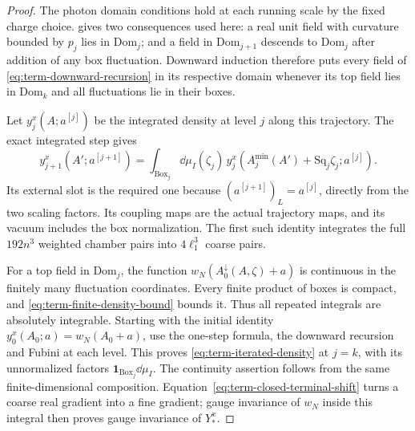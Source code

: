 \begin{proof}
The photon domain conditions
\cite[(43)]{MaxwellBlock} hold at each
running scale by the fixed charge choice.
\cite[Theorem~B]{MaxwellBlock} gives
two consequences used here: a real unit field with
curvature bounded by $p_j$ lies in $\mathrm{Dom}_j$;
and a field in $\mathrm{Dom}_{j+1}$ descends to
$\mathrm{Dom}_j$ after addition of any box fluctuation.
Downward induction therefore puts every field of
\eqref{eq:term-downward-recursion} in its respective
domain whenever its top field lies in $\mathrm{Dom}_k$ and
all fluctuations lie in their boxes.

Let $y_j^x(A;a^{[j]})$ be the integrated density
at level $j$ along this trajectory.
The exact integrated step \cite[(9)]{NonlinearStep} gives
\[
 y_{j+1}^x(A';a^{[j+1]})
     =\int_{\mathrm{Box}_j}\dd\mu_I(\zeta_j)\,
                   y_j^x(A_j^{\min}(A')+\mathrm{Sq}_j\zeta_j;
                                                               a^{[j]}).
\]
Its external slot is the required one because
$(a^{[j+1]})_L=a^{[j]}$, directly from the two
scaling factors.
Its coupling maps are the actual trajectory maps,
and its vacuum includes the box normalization.
The first such identity integrates the full
$192n^3$ weighted chamber pairs into
$4\ell_1^3$ coarse pairs.

For a top field in $\mathrm{Dom}_j$, the function
$w_N(A_0^\downarrow(A,\zeta)+a)$ is continuous in
the finitely many fluctuation coordinates.
Every finite product of boxes is compact,
and \eqref{eq:term-finite-density-bound} bounds it.
Thus all repeated integrals are absolutely integrable.
Starting with the initial identity
$y_0^x(A_0;a)=w_N(A_0+a)$, use the one-step formula,
the downward recursion and Fubini at each level.
This proves \eqref{eq:term-iterated-density} at $j=k$,
with its unnormalized factors
$\mathbf1_{\mathrm{Box}_j}\dd\mu_I$.
The continuity assertion follows from the same
finite-dimensional composition.
Equation~\eqref{eq:term-closed-terminal-shift}
turns a coarse real gradient into a fine gradient;
gauge invariance of $w_N$ inside this integral
then proves gauge invariance of $Y_*^x$.


\end{proof}
